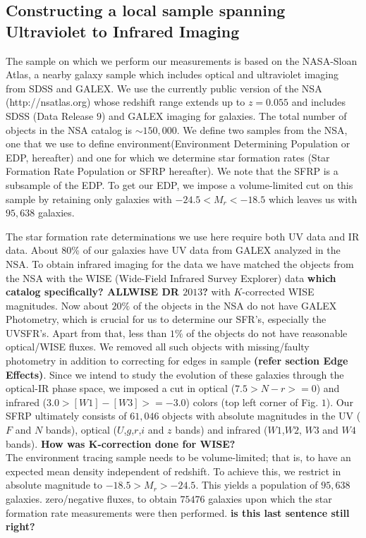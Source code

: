\documentclass[iop]{emulateapj}
\begin{document}
\subsection{Constructing a local sample spanning Ultraviolet to Infrared Imaging}

The sample on which we perform our measurements is based on the NASA-Sloan 
Atlas, a nearby galaxy sample which includes optical and ultraviolet 
imaging from SDSS and GALEX. We use the currently public version 
of the NSA (http://nsatlas.org) whose redshift range extends up 
to $z = 0.055$ and includes SDSS (Data Release $9$) and GALEX 
imaging for galaxies. The total number of objects in the NSA 
catalog is $\sim 150,000$. We define two samples from the NSA, one that we use to define environment(Environment Determining Population or EDP, hereafter) and one for which we determine star 
formation rates (Star Formation Rate Population or SFRP hereafter). We note that the SFRP is a subsample of the EDP. To get our EDP, we impose a volume-limited cut on this sample by retaining only galaxies with $-24.5 <M_{r}< -18.5$ which leaves us with $95,638$ galaxies. 


The star formation rate determinations we use here
require both UV data and IR data. About 80\% of our 
galaxies have UV data from GALEX analyzed in the NSA.
To obtain infrared imaging for the data we have 
matched the objects from the NSA with the WISE (Wide-Field Infrared 
Survey Explorer) data \textbf{which catalog specifically? ALLWISE DR $2013$?}
with $K$-corrected WISE magnitudes. 
Now about $20\%$ of the objects in the NSA do not have GALEX Photometry, which is crucial for us to determine our SFR's, especially the UVSFR's. Apart from that, less than $1\%$ of the objects do not have reasonable optical/WISE fluxes. We removed all such objects with missing/faulty photometry in addition to correcting for edges in sample \textbf{(refer section Edge Effects)}. Since we intend to study the evolution of these galaxies through the optical-IR phase space, we imposed a cut in optical ($7.5> N-r >=0 $) and infrared ($3.0> [W1]- [W3] >= -3.0$) colors (top left corner of Fig. $1$). Our SFRP ultimately consists of $61,046$ objects with absolute magnitudes in the UV ($F$ and $N$ bands), optical ($U$,$g$,$r$,$i$ and $z$ bands) and infrared ($W1$,$W2$, $W3$ and $W4$ bands). \textbf{How was K-correction done for WISE?} \\

 
The environment tracing sample needs to be volume-limited; that is,
to have an expected mean density independent of redshift. To
achieve this, we restrict in absolute magnitude to
$-18.5 > M_{r}  > -24.5$. This yields a
population of $95,638$ galaxies. 
zero/negative fluxes,  to obtain $75476$
galaxies upon which the star formation rate measurements were 
then performed. \textbf{is this last sentence still right?}\\
\end{document}
